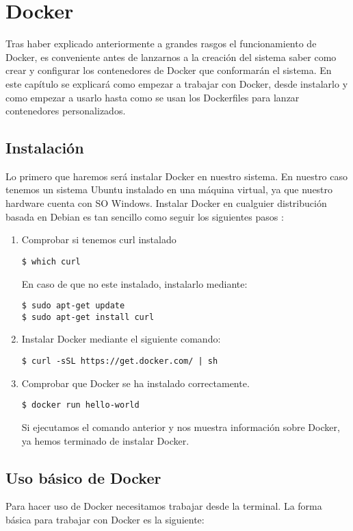 \chapter{Docker}
Tras haber explicado anteriormente a grandes rasgos el funcionamiento de Docker, es conveniente antes de lanzarnos a la creación del sistema saber como crear y configurar los contenedores de Docker que conformarán el sistema. En este capítulo se explicará como empezar a trabajar con Docker, desde instalarlo y como empezar a usarlo hasta como se usan los Dockerfiles para lanzar contenedores personalizados.

	\section{Instalación}
	Lo primero que haremos será instalar Docker en nuestro sistema. En nuestro caso tenemos un sistema Ubuntu instalado en una máquina virtual, ya que nuestro hardware cuenta con SO Windows. Instalar Docker en cualguier distribución basada en Debian es tan sencillo como seguir los siguientes pasos \cite{docker-install}:
	
	\lstset{language=bash, breaklines=true, basicstyle=\footnotesize}
	\begin{enumerate}
		\item Comprobar si tenemos curl instalado
		\begin{lstlisting}[style=consola]
$ which curl
		\end{lstlisting}
		En caso de que no este instalado, instalarlo mediante:
		\begin{lstlisting}[style=consola]
$ sudo apt-get update
$ sudo apt-get install curl
		\end{lstlisting}
		\item Instalar Docker mediante el siguiente comando:
		\begin{lstlisting}[style=consola]
$ curl -sSL https://get.docker.com/ | sh
		\end{lstlisting}
		\item Comprobar que Docker se ha instalado correctamente.
		\begin{lstlisting}[style=consola]
$ docker run hello-world
		\end{lstlisting}
			Si ejecutamos el comando anterior y nos muestra información sobre Docker, ya hemos terminado de instalar Docker.
	\end{enumerate}
	
	\section{Uso básico de Docker}
	Para hacer uso de Docker necesitamos trabajar desde la terminal. La forma básica para trabajar con Docker es la siguiente:
	
